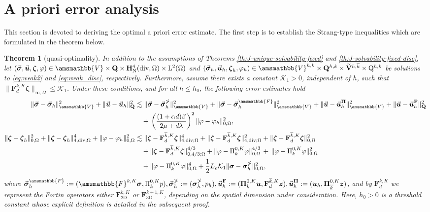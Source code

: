 \documentclass[fleqn,a4paper]{cas-sc}
\newcommand\vdiv{\mathop{\mathrm{div}}\nolimits}
\newcommand{\bF}{\mathbf{F}}
\newcommand{\bu}{\boldsymbol{u}}
\newcommand{\bz}{\boldsymbol{z}}
\newcommand{\bzeta}{\boldsymbol{\zeta}}
\newcommand{\bPi}{\boldsymbol{\Pi}}
\newcommand{\0}{\boldsymbol{0}}
\newcommand\bQ{\mathbf{Q}}
\newcommand\bV{\mathbf{V}}
\newcommand\rQ{\mathrm{Q}}
\newcommand\bbV{\amsmathbb{V}}
\newcommand\bH{\mathbf{H}}
\newcommand\rL{\mathrm{L}}
\newcommand\bbPi{\mathbb{\Pi}}
\newcommand\bbF{\amsmathbb{F}}
\newcommand\bsigma{\boldsymbol{\sigma}}
\numberwithin{equation}{section}
\numberwithin{figure}{section}
\newtheorem{theorem}{Theorem}[section]
\begin{document}
\section{A priori error analysis}\label{sec:error}
This section is devoted to deriving the optimal a priori error estimate. The first step is to establish the Strang-type inequalities which are formulated in the theorem below.
\begin{theorem}[quasi-optimality]\label{theorem:a_priori}
In addition to the assumptions of Theorems \ref{th:J-unique-solvability-fixed} and \ref{th:J-solvability-fixed-disc}, let $(\vec{\bsigma}, \vec{\bu}, \bzeta, \varphi) \in \bbV \times \bQ \times \bH^{4}_{\mathrm{N}}(\vdiv,\Omega) \times \rL^2(\Omega)$ and $(\vec{\bsigma}_h, \vec{\bu}_h, \bzeta_h, \varphi_h) \in \bbV^{h,k} \times \bQ^{h,k} \times \widetilde{\bV}^{h,\overline{k}} \times \rQ^{h,k}$ be solutions to \eqref{eq:weak2} and \eqref{eq:weak_disc}, respectively. Furthermore, assume there exists a constant $\mathcal{K}_1 > 0$, independent of $h$, such that $\|\bF_d^{\overline{k},K}\bzeta\|_{\infty,\Omega} \le \mathcal{K}_1$. Under these conditions, and for all $h \leq h_0$, the following error estimates hold 
\begin{subequations}
\begin{align}
    \|\vec{\bsigma}-\vec{\bsigma}_h\|^2_{\bbV}+\|\vec{\bu}-\vec{\bu}_h\|_{ \bQ }^2  &  \lesssim \|\vec{\bsigma}-\vec{\bsigma}_h^{\bbPi}\|_{\bbV}^2+\|\vec{\bsigma}-\vec{\bsigma}_h^{\bbF}\|^2_{\bbV}+\|\vec{\bu}-\vec{\bu}_h^{\bPi}\|_{\bbV}^2+\|\vec{\bu}-\vec{\bu}_h^{\bF}\|_{\bQ}^2 \notag \\
    &\quad + \, \left(\frac{(1+\alpha d)\beta}{2\mu + d\lambda}\right)^2\|\varphi-\varphi_h\|^2_{{0,\Omega}}, \label{a_priori_poro}\\
    \| \bzeta-\bzeta_h\|_{0,\Omega}^2+\| \bzeta-\bzeta_h\|_{4,\vdiv;\Omega}^4 +\|\varphi-\varphi_h\|_{ 0,\Omega}^2  &  \lesssim \|\bzeta-\bF_d^{\overline{k},K}\bzeta\|^4_{{4,\vdiv;\Omega}}+\|\bzeta-\bF_d^{\overline{k},K}\bzeta\|^2_{{4,\vdiv;\Omega}}+ \|\bzeta-\bF_d^{\overline{k},K}\bzeta\|^2_{{0,\Omega}}\notag\\
    & \quad + \|\bzeta-\bF_d^{\overline{k},K}\bzeta\|^{4/3}_{{0,4/3;\Omega}}+\|\varphi-\Pi_k^{0,K}\varphi\|^{4/3}_{0,\Omega}\,+\, \|\varphi-\Pi_k^{0,K}\varphi\|^{2}_{0,\Omega}\notag\\
    &\quad +\|\varphi-\Pi_k^{0,K}\varphi\|^{4}_{0,\Omega}+\frac{1}{2}L_{\varrho}\mathcal{K}_1\|\bsigma-\bsigma_h^{\bbPi}\|^{2}_{0,\Omega},\label{a_priori_diff}
\end{align}\end{subequations}
where $\vec{\bsigma}_h^{\bbF}:= (\bbF^{k,K}\bsigma,\Pi_{k}^{0,K}p ), \vec{\bsigma}_h^{\bbPi}:= (\bsigma_h^{\bbPi},p_h ), \vec{\bu}_h^{\bF}:= (\bPi^{0,K}_k\bu,\bF_d^{\overline{k},K} \bz), \vec{\bu}_h^{\bPi}:= (\bu_h,{\bPi}_{\overline{k}}^{0,K}\bz)$, and by $\bF_d^{\overline{k},K}$ we represent the Fortin operators either $\bF_{\mathrm{2D}}^{k,K}$ or $\bF_{\mathrm{3D}}^{k+1,K}$, depending on the spatial dimension under consideration. Here, $h_0 > 0$ is a threshold constant whose explicit definition is detailed in the subsequent proof.
\end{theorem}
\end{document}
